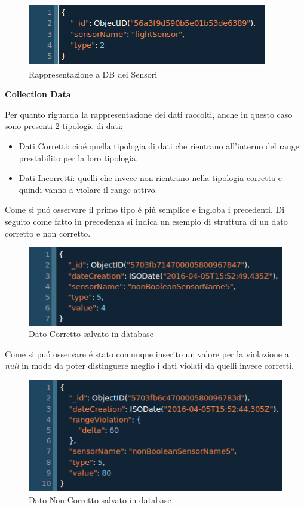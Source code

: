 \begin{figure}[ht]
\centering
\includegraphics[scale=0.5,natwidth=610,natheight=642]{Figures/DataStructures/Sensors.png}
\caption{Rappresentazione a DB dei Sensori}
\end{figure}

\begin{center}
\textbf{Collection Data}
\end{center}

Per quanto riguarda la rappresentazione dei dati raccolti, anche in questo caso sono presenti 2 tipologie di dati:
\begin{itemize}
\item Dati Corretti: cio\'e quella tipologia di dati che rientrano all'interno del range prestabilito per la loro tipologia.
\item Dati Incorretti: quelli che invece non rientrano nella tipologia corretta e quindi vanno a violare il range attivo.
\end{itemize}

Come si pu\'o osservare il primo tipo \'e pi\'u semplice e ingloba i precedenti. Di seguito come fatto in precedenza si indica un esempio di struttura di un dato corretto e non corretto.

\begin{figure}[ht]
\centering
\includegraphics[scale=0.5,natwidth=610,natheight=642]{Figures/DataStructures/DataNoViolation.png}
\caption{Dato Corretto salvato in database}
\end{figure}

Come si pu\'o osservare \'e stato comunque inserito un valore per la violazione a \textit{null} in modo da poter distinguere meglio i dati violati da quelli invece corretti.

\begin{figure}[ht]
\centering
\includegraphics[scale=0.5,natwidth=610,natheight=642]{Figures/DataStructures/DataViolation.png}
\caption{Dato Non Corretto salvato in database}
\end{figure}

